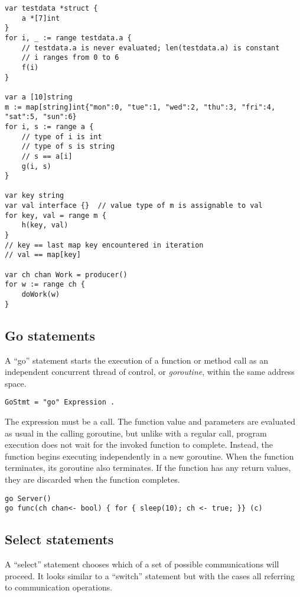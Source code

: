 {\begin{Verbatim}[frame=single]
var testdata *struct {
    a *[7]int
}
for i, _ := range testdata.a {
    // testdata.a is never evaluated; len(testdata.a) is constant
    // i ranges from 0 to 6
    f(i)
}

var a [10]string
m := map[string]int{"mon":0, "tue":1, "wed":2, "thu":3, "fri":4, "sat":5, "sun":6}
for i, s := range a {
    // type of i is int
    // type of s is string
    // s == a[i]
    g(i, s)
}

var key string
var val interface {}  // value type of m is assignable to val
for key, val = range m {
    h(key, val)
}
// key == last map key encountered in iteration
// val == map[key]

var ch chan Work = producer()
for w := range ch {
    doWork(w)
}
\end{Verbatim}

\subsection*{Go statements}

A ``go'' statement starts the execution of a function or method call as
an independent concurrent thread of control, or \emph{goroutine}, within
the same address space.

\begin{Verbatim}[frame=single]
GoStmt = "go" Expression .
\end{Verbatim}

The expression must be a call. The function value and parameters are
evaluated as usual in the calling goroutine, but
unlike with a regular call, program execution does not wait for the
invoked function to complete. Instead, the function begins executing
independently in a new goroutine. When the function terminates, its
goroutine also terminates. If the function has any return values, they
are discarded when the function completes.

\begin{Verbatim}[frame=single]
go Server()
go func(ch chan<- bool) { for { sleep(10); ch <- true; }} (c)
\end{Verbatim}

\subsection*{Select statements}

A ``select'' statement chooses which of a set of possible communications
will proceed. It looks similar to a ``switch'' statement but with the
cases all referring to communication operations.

}
